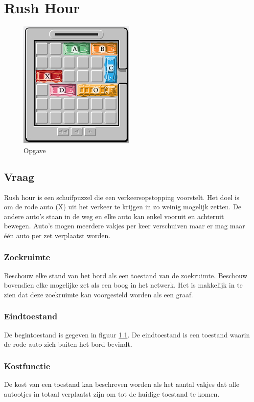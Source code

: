 \documentclass[alternative-exam.tex]{subfiles}
\begin{document}
\chapter{Rush Hour}
\begin{figure}[H]
\label{rushour}
\caption{Opgave}
\begin{center}
\includegraphics[scale=1.25]{resources/pictures/rushhour.jpg}
\end{center}
\end{figure}

\section{Vraag}
Rush hour is een schuifpuzzel die een verkeersopstopping voorstelt. Het doel is om de rode auto (X) uit het verkeer te krijgen in zo weinig mogelijk zetten. De andere auto's staan in de weg en elke auto kan enkel vooruit en achteruit bewegen. Auto's mogen meerdere vakjes per keer verschuiven maar er mag maar één auto per zet verplaatst worden.

\subsection{Zoekruimte}
Beschouw elke stand van het bord als een toestand van de zoekruimte. Beschouw bovendien elke mogelijke zet als een boog in het netwerk. Het is makkelijk in te zien dat deze zoekruimte kan voorgesteld worden als een graaf.

\subsection{Eindtoestand} De begintoestand is gegeven in figuur \ref{rushour}. De eindtoestand is een toestand waarin de rode auto zich buiten het bord bevindt. 

\subsection{Kostfunctie}De kost van een toestand kan beschreven worden als het aantal vakjes dat alle autootjes in totaal verplaatst zijn om tot de huidige toestand te komen. 
\end{document}
